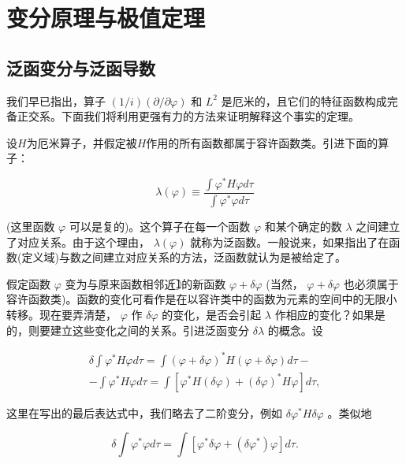 \chapter{变分原理与极值定理}

\section{泛函变分与泛函导数}

我们早已指出，算子 $(1 / i)(\partial /\partial \varphi)$ 和 $L^2$ 是厄米的，且它们的特征函数构成完备正交系。下面我们将利用更强有力的方法来证明解释这个事实的定理。

设$H$为厄米算子，并假定被$H$作用的所有函数都属于容许函数类。引进下面的算子：

\begin{equation*}
\lambda (\varphi) \equiv \frac {\int \varphi^ {*} H \varphi d \tau}{\int \varphi^ {*} \varphi d \tau}\tag{4.1}
\end{equation*}

(这里函数 $\varphi$ 可以是复的)。这个算子在每一个函数 $\varphi$ 和某个确定的数 $\lambda$ 之间建立了对应关系。由于这个理由， $\lambda(\varphi)$ 就称为泛函数。一般说来，如果指出了在函数(定义域)与数之间建立对应关系的方法，泛函数就认为是被给定了。

假定函数 $\varphi$ 变为与原来函数相邻近\textcircled{1}的新函数 $\varphi +\delta \varphi$ (当然， $\varphi + \delta\varphi$ 也必须属于容许函数类)。函数的变化可看作是在以容许类中的函数为元素的空间中的无限小转移。现在要弄清楚， $\varphi$ 作 $\delta\varphi$ 的变化，是否会引起 $\lambda$ 作相应的变化？如果是的，则要建立这些变化之间的关系。引进泛函变分 $\delta\lambda$ 的概念。设

\begin{equation*}
\begin{array}{c} \delta \int \varphi^ {*} H \varphi d \tau = \int (\varphi + \delta \varphi) ^ {*} H (\varphi + \delta \varphi) d \tau - \\ - \int \varphi^ {*} H \varphi d \tau = \int [ \varphi^ {*} H (\delta \varphi) + (\delta \varphi) ^ {*} H \varphi ] d \tau , \end{array}\tag{4.2}
\end{equation*}

这里在写出的最后表达式中，我们略去了二阶变分，例如 $\delta \varphi^{*}H\delta \varphi$ 。类似地

\begin{equation*}
\delta \int \varphi^ {*} \varphi d \tau = \int [ \varphi^ {*} \delta \varphi + (\delta \varphi^ {*}) \varphi ] d \tau .\tag{4.3}
\end{equation*}

